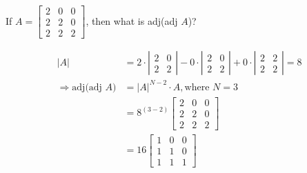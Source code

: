 

\question[2] If $A = \left[ 
  \begin{array}{ccc}
    2 & 0 & 0 \\
    2 & 2 & 0 \\
    2 & 2 & 2
  \end{array}
\right]$, then what is adj(adj $A$)?


\ifprintanswers
\fi 

\begin{solution}[\halfpage]
  \begin{align}
    |A| &= 2\cdot\left| \begin{array}{cc}
      2 & 0 \\
      2 & 2
    \end{array}\right| - 0\cdot\left| \begin{array}{cc}
      2 & 0 \\
      2 & 2
    \end{array}\right| + 0\cdot\left| \begin{array}{cc}
      2 & 2 \\
      2 & 2
    \end{array}\right| = 8 \\
    \Rightarrow \text{adj(adj $A$)} &= |A|^{N-2}\cdot A, \text{where } N = 3 \\
            &= 8^{(3-2)}\left[
              \begin{array}{ccc}
                2 & 0 & 0 \\
                2 & 2 & 0 \\
                2 & 2 & 2
              \end{array}
            \right] \\
            &= 16\left[
              \begin{array}{ccc}
                1 & 0 & 0 \\
                1 & 1 & 0 \\
                1 & 1 & 1
              \end{array}
            \right]
  \end{align}
\end{solution}
